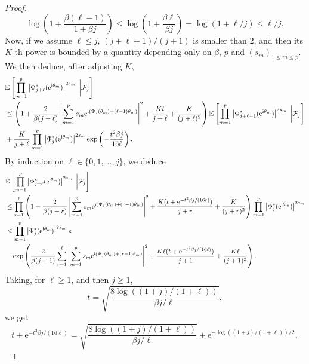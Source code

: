\documentclass[]{article}
\begin{document}
\begin{proof}
$$\log \left(1 + \frac{\beta(\ell-1)}{1 + \beta j} \right) \leq  \log \left(1 + \frac{\beta \ell}{ \beta j} \right) = \log (1 + \ell/j) \leq \ell/j.$$
Now, if we assume $\ell \leq j$, 
$(j+\ell+1)/(j+1)$ is smaller than $2$, and then 
its $K$-th power is bounded by a quantity depending only on $\beta$, $p$
and $(s_m)_{1 \leq m \leq p}$. We then deduce, after adjusting $K$, 
\begin{align*}
& \mathbb{E} \left[ \prod_{m=1}^p \left|\Phi^*_{j+\ell} (\mathrm{e}^{\textnormal{i} \theta_m})
\right|^{2s_m} \;  \bigg| \mathcal{F}_j \right]
\\ & \leq 
 \left(1 + \frac{2}{ \beta(j+\ell)} \left|\sum_{m=1}^{p} s_m \mathrm{e}^{\textnormal{i} (\Psi_{j} (\theta_m) + (\ell-1) \theta_m) }\right|^2
 +\frac{Kt}{j+\ell} + \frac{K}{(j+\ell)^2}\right) 
 \mathbb{E} \left[ \prod_{m=1}^p \left|\Phi^*_{j+\ell-1} (\mathrm{e}^{\textnormal{i} \theta_m})
\right|^{2s_m} \;  \bigg| \mathcal{F}_j \right]
\\ & + \frac{K}{j+\ell}
\prod_{m=1}^p \left|\Phi^*_{j} (\mathrm{e}^{\textnormal{i} \theta_m})
\right|^{2s_m}  \exp \left( - \frac{t^2  \beta j}{16 \ell}\right).
\end{align*}
By induction on $\ell \in \{0,1,\dots, j\}$, we deduce
\begin{align*}
& \mathbb{E} \left[ \prod_{m=1}^p \left|\Phi^*_{j+\ell} (\mathrm{e}^{\textnormal{i} \theta_m})
\right|^{2s_m} \;  \bigg| \mathcal{F}_j \right]
\\ & \leq 
\prod_{r = 1}^{\ell} \left(1 + \frac{2}{ \beta(j+r)} \left|\sum_{m=1}^{p} s_m \mathrm{e}^{\textnormal{i} (\Psi_{j} (\theta_m) + (r-1) \theta_m) }\right|^2
 +\frac{K (t + \mathrm{e}^{-t^2 \beta j/(16 r)})}{j+r} + \frac{K}{(j+r)^2}\right) 
 \prod_{m=1}^p \left|\Phi^*_{j} (\mathrm{e}^{\textnormal{i} \theta_m})
\right|^{2s_m}
\\ & \leq \prod_{m=1}^p \left|\Phi^*_{j} (\mathrm{e}^{\textnormal{i} \theta_m})
\right|^{2s_m} \times \\  
&\ \ \ \exp \left( 
\frac{2}{\beta (j+1)} \sum_{r = 1}^{\ell}
\left|\sum_{m=1}^{p} s_m \mathrm{e}^{\textnormal{i} (\Psi_{j} (\theta_m) + (r-1) \theta_m) }\right|^2 
+ \frac{K \ell (t + \mathrm{e}^{-t^2 \beta j/(16 \ell)})}{j+1}
+ \frac{K \ell}{(j+1)^2}
\right).
\end{align*}
Taking, for $\ell \geq 1$, and then $j \geq 1$, $$t = \sqrt{\frac{ 8 \log ((1+j)/(1+\ell))}{\beta j/\ell}},$$
we get 
$$t + \mathrm{e}^{-t^2 \beta j/(16 \ell)} 
= \sqrt{\frac{ 8 \log ((1+j)/(1+\ell))}{\beta j/\ell}}
+ \mathrm{e}^{- \log ((1+j)/(1+\ell)) / 2},$$

\end{proof}
\end{document}
